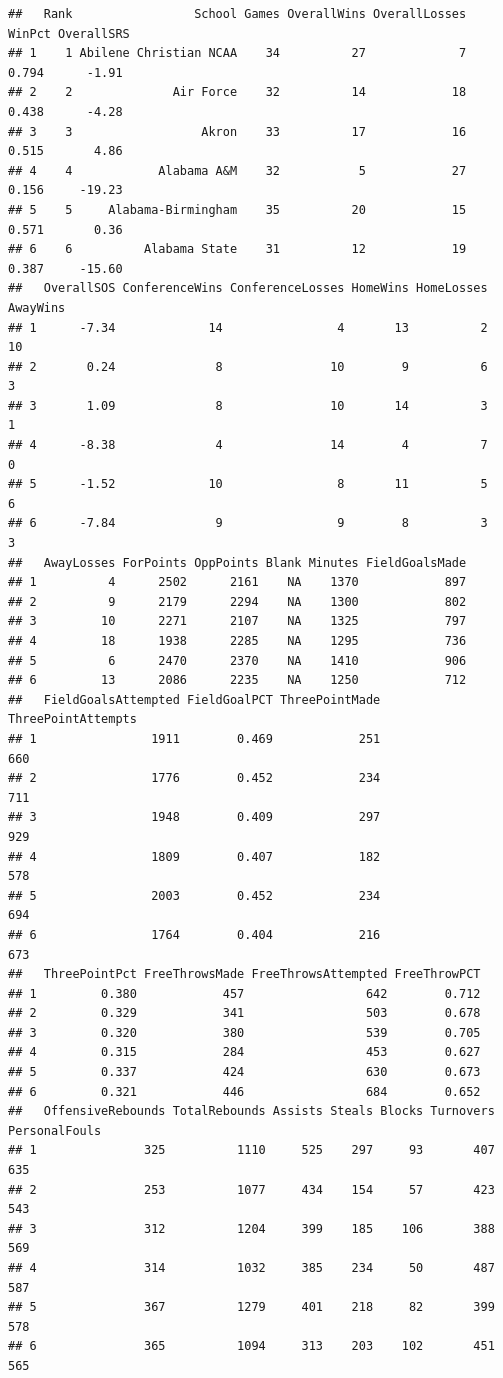 \documentclass[]{book}
\begin{document}
\begin{verbatim}
##   Rank                 School Games OverallWins OverallLosses WinPct OverallSRS
## 1    1 Abilene Christian NCAA    34          27             7  0.794      -1.91
## 2    2              Air Force    32          14            18  0.438      -4.28
## 3    3                  Akron    33          17            16  0.515       4.86
## 4    4            Alabama A&M    32           5            27  0.156     -19.23
## 5    5     Alabama-Birmingham    35          20            15  0.571       0.36
## 6    6          Alabama State    31          12            19  0.387     -15.60
##   OverallSOS ConferenceWins ConferenceLosses HomeWins HomeLosses AwayWins
## 1      -7.34             14                4       13          2       10
## 2       0.24              8               10        9          6        3
## 3       1.09              8               10       14          3        1
## 4      -8.38              4               14        4          7        0
## 5      -1.52             10                8       11          5        6
## 6      -7.84              9                9        8          3        3
##   AwayLosses ForPoints OppPoints Blank Minutes FieldGoalsMade
## 1          4      2502      2161    NA    1370            897
## 2          9      2179      2294    NA    1300            802
## 3         10      2271      2107    NA    1325            797
## 4         18      1938      2285    NA    1295            736
## 5          6      2470      2370    NA    1410            906
## 6         13      2086      2235    NA    1250            712
##   FieldGoalsAttempted FieldGoalPCT ThreePointMade ThreePointAttempts
## 1                1911        0.469            251                660
## 2                1776        0.452            234                711
## 3                1948        0.409            297                929
## 4                1809        0.407            182                578
## 5                2003        0.452            234                694
## 6                1764        0.404            216                673
##   ThreePointPct FreeThrowsMade FreeThrowsAttempted FreeThrowPCT
## 1         0.380            457                 642        0.712
## 2         0.329            341                 503        0.678
## 3         0.320            380                 539        0.705
## 4         0.315            284                 453        0.627
## 5         0.337            424                 630        0.673
## 6         0.321            446                 684        0.652
##   OffensiveRebounds TotalRebounds Assists Steals Blocks Turnovers PersonalFouls
## 1               325          1110     525    297     93       407           635
## 2               253          1077     434    154     57       423           543
## 3               312          1204     399    185    106       388           569
## 4               314          1032     385    234     50       487           587
## 5               367          1279     401    218     82       399           578
## 6               365          1094     313    203    102       451           565
\end{verbatim}
\end{document}
